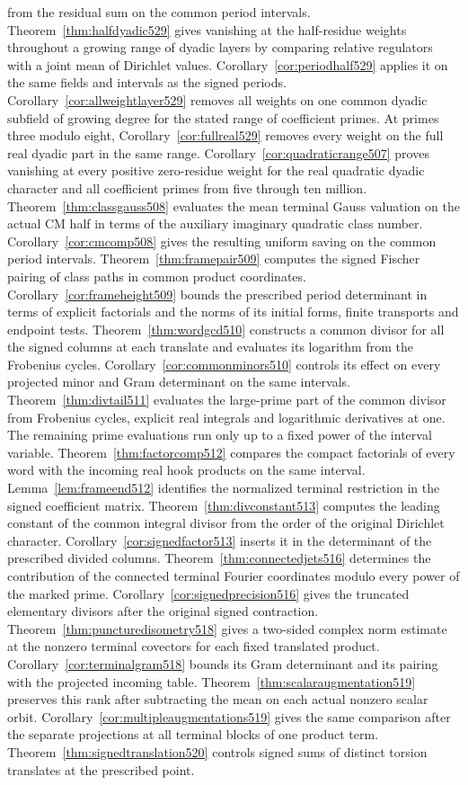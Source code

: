 \documentclass[a4paper,11pt]{article}
\theoremstyle{definition}
\theoremstyle{remark}
\numberwithin{equation}{section}
\begin{document}
from the residual sum on the common period intervals. Theorem~\ref{thm:halfdyadic529} gives vanishing at the half-residue weights throughout a growing range of dyadic layers by comparing relative regulators with a joint mean of Dirichlet values. Corollary~\ref{cor:periodhalf529} applies it on the same fields and intervals as the signed periods. Corollary~\ref{cor:allweightlayer529} removes all weights on one common dyadic subfield of growing degree for the stated range of coefficient primes. At primes three modulo eight, Corollary~\ref{cor:fullreal529} removes every weight on the full real dyadic part in the same range. Corollary~\ref{cor:quadraticrange507} proves vanishing at every positive zero-residue weight for the real quadratic dyadic character and all coefficient primes from five through ten million. Theorem~\ref{thm:classgauss508} evaluates the mean terminal Gauss valuation on the actual CM half in terms of the auxiliary imaginary quadratic class number. Corollary~\ref{cor:cmcomp508} gives the resulting uniform saving on the common period intervals. Theorem~\ref{thm:framepair509} computes the signed Fischer pairing of class paths in common product coordinates. Corollary~\ref{cor:frameheight509} bounds the prescribed period determinant in terms of explicit factorials and the norms of its initial forms, finite transports and endpoint tests. Theorem~\ref{thm:wordgcd510} constructs a common divisor for all the signed columns at each translate and evaluates its logarithm from the Frobenius cycles. Corollary~\ref{cor:commonminors510} controls its effect on every projected minor and Gram determinant on the same intervals. Theorem~\ref{thm:divtail511} evaluates the large-prime part of the common divisor from Frobenius cycles, explicit real integrals and logarithmic derivatives at one. The remaining prime evaluations run only up to a fixed power of the interval variable. Theorem~\ref{thm:factorcomp512} compares the compact factorials of every word with the incoming real hook products on the same interval. Lemma~\ref{lem:frameend512} identifies the normalized terminal restriction in the signed coefficient matrix. Theorem~\ref{thm:divconstant513} computes the leading constant of the common integral divisor from the order of the original Dirichlet character. Corollary~\ref{cor:signedfactor513} inserts it in the determinant of the prescribed divided columns. Theorem~\ref{thm:connectedjets516} determines the contribution of the connected terminal Fourier coordinates modulo every power of the marked prime. Corollary~\ref{cor:signedprecision516} gives the truncated elementary divisors after the original signed contraction. Theorem~\ref{thm:puncturedisometry518} gives a two-sided complex norm estimate at the nonzero terminal covectors for each fixed translated product. Corollary~\ref{cor:terminalgram518} bounds its Gram determinant and its pairing with the projected incoming table. Theorem~\ref{thm:scalaraugmentation519} preserves this rank after subtracting the mean on each actual nonzero scalar orbit. Corollary~\ref{cor:multipleaugmentations519} gives the same comparison after the separate projections at all terminal blocks of one product term. Theorem~\ref{thm:signedtranslation520} controls signed sums of distinct torsion translates at the prescribed point. 
\end{document}

